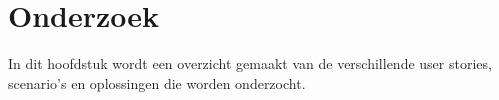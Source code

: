
\chapter{Onderzoek}
\label{ch:onderzoek}

In dit hoofdstuk wordt een overzicht gemaakt van de verschillende user stories, scenario's en oplossingen die worden onderzocht.